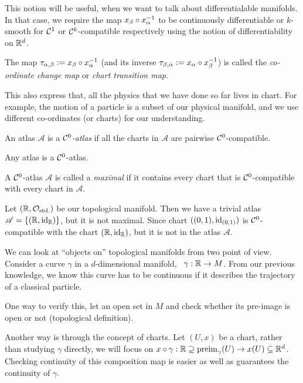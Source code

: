 This notion will be useful, when we want to talk about differentialable manifolds. In that case, we require the map \(x_{\beta} \circ x_{\alpha}^{-1}\) to be continuously differentiable or \(k\)-smooth for \(\mathcal C^1\) or \(\mathcal C^k\)-compatible respectively using the notion of differentiability on \(\mathbb R^d\).

\begin{remark}
	The map \(\tau_{\alpha, \beta} := x_{\beta} \circ x_{\alpha}^{-1}\) (and its inverse \(\tau_{\beta, \alpha} := x_{\alpha} \circ x_{\beta}^{-1}\)) is called the \emph{co-ordinate change map} or \emph{chart transition map}.
\end{remark}
This also express that, all the physics that we have done so far lives in chart. For example, the motion of a particle is a subset of our physical manifold, and we use different co-ordinates (or charts) for our understanding.

\begin{definition}[\(\SC^0\)-Atlas]
	An atlas \(\mathscr{A}\) is a \emph{\(\SC^0\)-atlas} if all the charts in \(\mathscr{A}\) are pairwise \(\SC^0\)-compatible.
\end{definition}

\noindent Any atlas is a \(\SC^0\)-atlas.

\begin{definition}
	A \(\SC^0\)-atlas \(\mathscr{A}\) is called a \emph{maximal} if it contains every chart that is \(\SC^0\)-compatible with every chart in \(\mathscr{A}\).
\end{definition}

\begin{example}
	Let \((\mathbb R, \mathcal{O}_{\text{std.}})\) be our topological manifold. Then we have a trivial atlas \(\mathscr{A} = \qty{(\mathbb R, \operatorname{id}_{\mathbb R})}\), but it is not maximal. Since chart \(((0, 1), \operatorname{id}_{(0, 1)})\) is \(\SC^0\)-compatible with the chart \((\mathbb R, \operatorname{id}_{\mathbb R})\), but it is not in the atlas \(\mathscr{A}\).
\end{example}

We can look at ``objects on'' topological manifolds from two point of view. Consider a curve \(\gamma\) in a \(d\)-dimensional manifold, \ie\ \(\gamma: \mathbb R \to M\). From our previous knowledge, we know this curve has to be continuous if it describes the trajectory of a classical particle.

One way to verify this, let an open set in \(M\) and check whether its pre-image is open or not (topological definition).

Another way is through the concept of charts. Let \((U, x)\) be a chart, rather than studying \(\gamma\) directly, we will focus on \(x \circ \gamma: \mathbb R \supseteq \operatorname{preim}_{\gamma}(U) \to x(U) \subseteq \mathbb R^d\). Checking continuity of this composition map is easier as well as guarantees the continuity of \(\gamma\).


